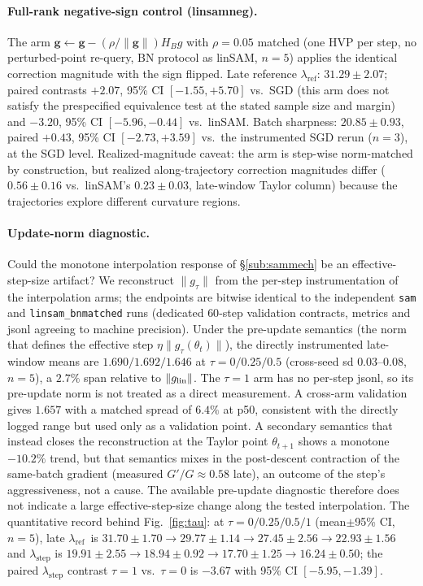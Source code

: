\documentclass{article}
\theoremstyle{plain}
\theoremstyle{definition}
\theoremstyle{remark}
\newcommand{\lref}{\ensuremath{\lambda_{\mathrm{ref}}}}
\newcommand{\lstep}{\ensuremath{\lambda_{\mathrm{step}}}}
\begin{document}
\paragraph{Full-rank negative-sign control (linsamneg).}
The arm $\mathbf{g}\leftarrow\mathbf{g}-(\rho/\|\mathbf{g}\|)H_{B}g$
with $\rho{=}0.05$ matched (one HVP per step, no perturbed-point
re-query, BN protocol as linSAM, $n{=}5$) applies the identical
correction magnitude with the sign flipped. Late reference \lref:
$31.29\pm2.07$; paired contrasts ${+}2.07$, 95\% CI $[{-}1.55,{+}5.70]$
vs.\ SGD (this arm does not satisfy the prespecified equivalence test
at the stated sample size and margin) and ${-}3.20$, 95\% CI
$[{-}5.96,{-}0.44]$ vs.\ linSAM. Batch
sharpness: $20.85\pm0.93$, paired ${+}0.43$, 95\% CI $[{-}2.73,{+}3.59]$
vs.\ the
instrumented SGD rerun ($n{=}3$), at the SGD level. Realized-magnitude
caveat: the arm is step-wise norm-matched by construction, but
realized along-trajectory correction magnitudes differ
($0.56\pm0.16$ vs.\ linSAM's $0.23\pm0.03$, late-window Taylor
column) because the trajectories explore different curvature regions.

\paragraph{Update-norm diagnostic.}
\label{par:taunorm}
Could the monotone interpolation response of \S\ref{sub:sammech} be
an effective-step-size artifact? We reconstruct $\|g_\tau\|$ from the
per-step instrumentation of the interpolation arms; the endpoints are
bitwise identical to the independent \texttt{sam} and
\texttt{linsam\_bnmatched} runs (dedicated $60$-step validation
contracts, metrics and jsonl agreeing to machine precision). Under
the pre-update semantics (the norm that defines the effective step
$\eta\|g_\tau(\theta_t)\|$), the directly instrumented late-window means
are $1.690/1.692/1.646$ at $\tau=0/0.25/0.5$ (cross-seed sd
$0.03$--$0.08$, $n{=}5$), a $2.7\%$ span relative to $\|g_{\rm lin}\|$.
The $\tau{=}1$ arm has no per-step jsonl, so its pre-update norm is not
treated as a direct measurement. A cross-arm validation gives $1.657$
with a matched spread of $6.4\%$ at p50, consistent with the directly
logged range but used only as a validation point. A secondary
semantics that instead closes the reconstruction at the Taylor point
$\theta_{t+1}$ shows a monotone $-10.2\%$ trend, but that semantics
mixes in the post-descent contraction of the same-batch gradient
(measured $G'/G\approx0.58$ late), an outcome of the step's
aggressiveness, not a cause. The available pre-update diagnostic
therefore does not indicate a large effective-step-size change along
the tested interpolation. The
quantitative record behind Fig.~\ref{fig:tau}: at
$\tau=0/0.25/0.5/1$ (mean$\pm$95\% CI, $n{=}5$), late \lref\ is
$31.70\pm1.70\to29.77\pm1.14\to27.45\pm2.56\to22.93\pm1.56$ and
$\lstep$ is
$19.91\pm2.55\to18.94\pm0.92\to17.70\pm1.25\to16.24\pm0.50$; the
paired $\lstep$ contrast $\tau{=}1$ vs.\ $\tau{=}0$ is $-3.67$ with
95\% CI $[-5.95,-1.39]$.
\end{document}
